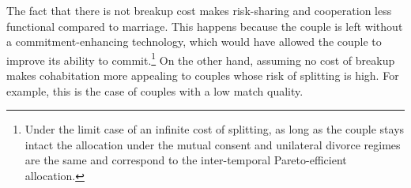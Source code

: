 \documentclass[12pt]{article}
\numberwithin{table}{section}
\DeclareMathOperator*{\argmax}{arg\,max}
\begin{document}

The fact that there is not breakup cost makes risk-sharing and cooperation less functional compared to marriage. This happens because the couple is left without a commitment-enhancing technology, which would have allowed the couple to improve its ability to commit.\footnote{Under the limit case of an infinite cost of splitting, as long as the couple stays intact the allocation under the mutual consent and unilateral divorce regimes are the same and correspond to the inter-temporal Pareto-efficient allocation.} On the other hand, assuming no cost of breakup makes cohabitation more appealing to couples whose risk of splitting is high. For example, this is the case of couples with a low match quality.
\end{document}
